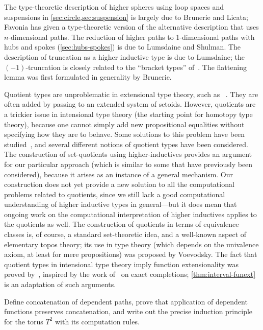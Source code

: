 The type-theoretic description of higher spheres using loop spaces and suspensions in \autoref{sec:circle,sec:suspension} is largely due to  Brunerie and  Licata; Favonia has given a type-theoretic version of the alternative description that uses $n$-dimensional paths.
The reduction of higher paths to 1-dimensional paths with hubs and spokes (\autoref{sec:hubs-spokes}) is due to  Lumsdaine and  Shulman.
The description of truncation as a higher inductive type is due to  Lumsdaine; the $(-1)$-truncation is closely related to the ``bracket types'' of~\cite{ab:bracket-types}.
The flattening lemma was first formulated in generality by  Brunerie.

Quotient types are unproblematic in extensional type theory, such as \NuPRL~\cite{constable+86nuprl-book}.
They are often added by passing to an extended system of setoids.
However, quotients are a trickier issue in intensional type theory (the starting point for homotopy type theory), because one cannot simply add new propositional equalities without specifying how they are to behave. Some solutions to this problem have been studied~\cite{hofmann:thesis,Altenkirch1999,altenkirch+07ott}, and several different notions of quotient types have been considered.  The construction of set-quotients using higher-inductives provides an argument for our particular approach (which is similar to some that have previously been considered), because it arises as an instance of a general mechanism.  Our construction does not yet provide a new solution to all the computational problems related to quotients, since we still lack a good computational understanding of higher inductive types in general---but it does mean that ongoing work on the computational interpretation of higher inductives applies to the quotients as well.  The construction of quotients in terms of equivalence classes is, of
course, a standard set-theoretic idea, and a well-known aspect of elementary topos theory; its use in type theory (which depends on the univalence axiom, at least for mere propositions) was proposed by Voevodsky.  The fact that quotient types in intensional type theory imply function extensionality was proved by~\cite{hofmann:thesis}, inspired by the work of~\cite{carboni} on exact completions; \autoref{thm:interval-funext} is an adaptation of such arguments.

\sectionExercises

\begin{ex}\label{ex:torus}
  Define concatenation of dependent paths, prove that application of dependent functions preserves concatenation, and write out the precise induction principle for the torus $T^2$ with its computation rules.
\end{ex}

